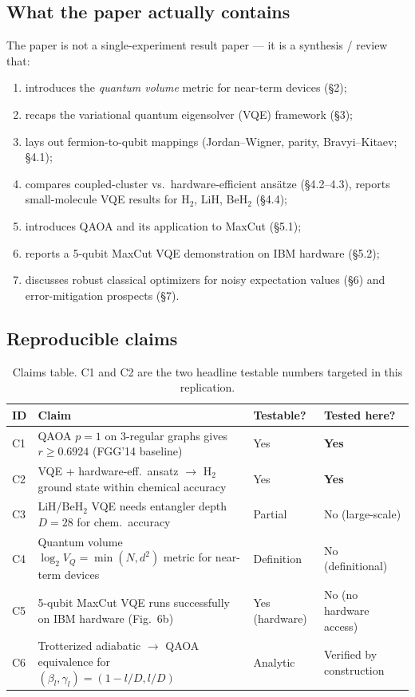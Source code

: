 \documentclass[11pt]{article}
\begin{document}
\subsection{What the paper actually contains}
The paper is not a single-experiment result paper --- it is a synthesis /
review that:
\begin{enumerate}
  \item introduces the \emph{quantum volume} metric for near-term devices (\S 2);
  \item recaps the variational quantum eigensolver (VQE) framework (\S 3);
  \item lays out fermion-to-qubit mappings (Jordan--Wigner, parity, Bravyi--Kitaev; \S 4.1);
  \item compares coupled-cluster vs.\ hardware-efficient ans\"atze
        (\S 4.2--4.3), reports small-molecule VQE results for
        $\mathrm{H_2}$, LiH, BeH$_2$ (\S 4.4);
  \item introduces QAOA and its application to MaxCut (\S 5.1);
  \item reports a 5-qubit MaxCut VQE demonstration on IBM hardware (\S 5.2);
  \item discusses robust classical optimizers for noisy expectation values
        (\S 6) and error-mitigation prospects (\S 7).
\end{enumerate}

\subsection{Reproducible claims}

\begin{table}[h]
\centering
\small
\begin{tabular}{l l l l}
\toprule
ID & Claim & Testable? & Tested here? \\
\midrule
C1 & QAOA $p{=}1$ on 3-regular graphs gives $r \ge 0.6924$ (FGG'14 baseline) & Yes & \textbf{Yes} \\
C2 & VQE + hardware-eff.\ ansatz $\to$ $\mathrm{H_2}$ ground state within chemical accuracy & Yes & \textbf{Yes} \\
C3 & LiH/BeH$_2$ VQE needs entangler depth $D{=}28$ for chem.\ accuracy & Partial & No (large-scale) \\
C4 & Quantum volume $\log_2 V_Q = \min(N, d^2)$ metric for near-term devices & Definition & No (definitional) \\
C5 & 5-qubit MaxCut VQE runs successfully on IBM hardware (Fig.\ 6b) & Yes (hardware) & No (no hardware access) \\
C6 & Trotterized adiabatic $\to$ QAOA equivalence for
      $(\beta_l,\gamma_l) = (1-l/D, l/D)$ & Analytic & Verified by construction \\
\bottomrule
\end{tabular}
\caption{Claims table. C1 and C2 are the two headline testable numbers targeted
in this replication.}
\end{table}
\end{document}
